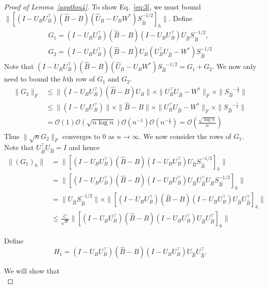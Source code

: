 \begin{proof}[Proof of Lemma~\ref{appthm4}]
To show Eq.~\eqref{eq:3}, we must bound $\|[ (I -U_B U_B^{\top}) (\hat{B} - B) (\hat{U}_B - U_B W^{*}) S_{\hat{B}}^{-1/2}]_{h}\|$.
Define 
\begin{gather*} G_1 =  (I -U_B U_B^{\top}) (\hat{B} - B) (I -U_B U_B^{\top}) U_{\hat{B}} S_{\hat{B}}^{-1/2}, \\
 G_2 =  (I -U_B U_B^{\top}) (\hat{B} - B) U_B ( U_B^{\top} U_{\hat{B}} - W^{*})S_{\hat{B}}^{-1/2} 
\end{gather*}
Note that $(I -U_B U_B^{\top}) (\hat{B} - B) (\hat{U}_B - U_B W^{*}) {S_{\hat{B}}}^{-1/2} = G_1 + G_2.$ 
We now only need to bound the $h$th row of $G_1$ and $G_2$.
\begin{align*}
    \| G_2 \|_F & \leq \|(I -U_B U_B^{\top}) (\hat{B} - B) U_B \| \times \| U_B^{\top} U_{\hat{B}} - W^{*} \|_F \times \| {S_{\hat{B}}}^{-\frac{1}{2}} \| \\
    & \leq \|(I -U_B U_B^{\top}) \| \times \|\hat{B} - B\| \times \| U_B^{\top} U_{\hat{B}} - W^{*} \|_F \times \| {S_{\hat{B}}}^{-\frac{1}{2}} \| \\
    & = \mathcal{O}(1) \mathcal{O}(\sqrt{n \log n} )  \mathcal{O}(n^{-1} ) \mathcal{O}(n^{-\frac{1}{2}} )  = \mathcal{O}(\frac{\sqrt{\log n}}{n}) 
\end{align*}
Thus $\|\sqrt{n} G_2 \|_F$ converges to $0$ as $n \rightarrow \infty.$
We now consider the rows of $G_1$. Note that $U_{\hat{B}}^{\top} U_{\hat{B}} = I $ and hence
\begin{align*}
    \|(G_1)_h\| & = \| [ (I -U_B U_B^{\top}) (\hat{B} - B) (I -U_B U_B^{\top}) U_{\hat{B}} S_{\hat{B}}^{-1/2} ]_h \| \\
    & = \| [ (I -U_B U_B^{\top}) (\hat{B} - B) (I -U_B U_B^{\top}) U_{\hat{B}} U_{\hat{B}}^{\top} U_{\hat{B}} S_{\hat{B}}^{-1/2} ]_h \| \\
    & = \| U_{\hat{B}} S_{\hat{B}}^{-1/2} \| \times \| [ (I -U_B U_B^{\top}) (\hat{B} - B) (I -U_B U_B^{\top}) U_{\hat{B}} U_{\hat{B}}^{\top} ]_h\| \\
    & \leq \frac{C}{\sqrt{n}} \| [ (I -U_B U_B^{\top}) (\hat{B} - B) (I -U_B U_B^{\top}) U_{\hat{B}} U_{\hat{B}}^{\top} ]_h\|
\end{align*}








Define $$ H_1 = (I -U_B U_B^{\top}) (\hat{B} - B) (I -U_B U_B^{\top}) U_{\hat{B}} U_{\hat{B}}^{\top}.$$ 

We will show that 
$$ $$







\end{proof}
